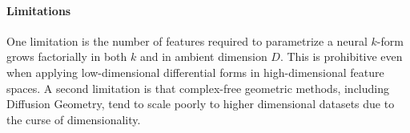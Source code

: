 \documentclass{article}
\theoremstyle{remark}
\theoremstyle{plain}
\begin{document}


\paragraph{Limitations} One limitation is the number of features required to parametrize a neural $k$-form grows factorially in both $k$ and in ambient dimension $D$. This is prohibitive even when applying low-dimensional differential forms in high-dimensional feature spaces. A second limitation is that complex-free geometric methods, including Diffusion Geometry, tend to scale poorly to higher dimensional datasets due to the curse of dimensionality.
\end{document}

